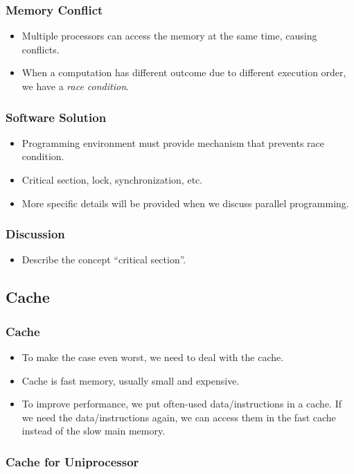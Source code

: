 \documentclass{beamer}
\begin{document}
\begin{CJK}{UTF8}{bsmi}
\begin{frame}
\frametitle{Memory Conflict}
\begin{itemize}
\item Multiple processors can access the memory at the same time,
  causing conflicts.
\item When a computation has different outcome due to different
  execution order, we have a {\em race condition}.
\end{itemize}
\end{frame}

\begin{frame}
\frametitle{Software Solution}
\begin{itemize}
\item Programming environment must provide mechanism that prevents
  race condition.
\item Critical section, lock, synchronization, etc.
\item More specific details will be provided when we discuss parallel
  programming.
\end{itemize}
\end{frame}


\begin{frame}
\frametitle{Discussion}
\begin{itemize}
\item Describe the concept ``critical section''.
\end{itemize}
\end{frame}


\subsection{Cache}

\begin{frame}
\frametitle{Cache}
\begin{itemize}
\item To make the case even worst, we need to deal with the cache.
\item Cache is fast memory, usually small and expensive.
\item To improve performance, we put often-used data/instructions in a  cache. 
If we need the data/instructions again, we can access them in the fast cache instead of the slow main memory.
\end{itemize}
\end{frame}

\begin{frame}
\frametitle{Cache for Uniprocessor}
\centerline{}
\end{frame}


\end{CJK}
\end{document}
